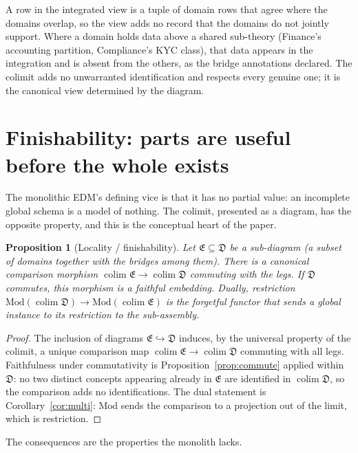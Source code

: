 \documentclass[11pt]{article}
\theoremstyle{plain}
\newtheorem{proposition}{Proposition}
\theoremstyle{definition}
\newcommand{\Mod}{\mathrm{Mod}}
\begin{document}
A row in the integrated view is a tuple of domain rows that agree where the domains overlap, so the view adds no record that the domains do not jointly support. Where a domain holds data above a shared sub-theory (Finance's accounting partition, Compliance's KYC class), that data appears in the integration and is absent from the others, as the bridge annotations declared. The colimit adds no unwarranted identification and respects every genuine one; it is the canonical view determined by the diagram.

\section{Finishability: parts are useful before the whole exists}\label{sec:finish}

The monolithic EDM's defining vice is that it has no partial value: an incomplete global schema is a model of nothing. The colimit, presented as a diagram, has the opposite property, and this is the conceptual heart of the paper.

\begin{proposition}[Locality / finishability]\label{prop:finish}
Let $\mathfrak{E}\subseteq\mathfrak{D}$ be a sub-diagram (a subset of domains together with the bridges among them). There is a canonical comparison morphism $\operatorname{colim}\mathfrak{E}\to\operatorname{colim}\mathfrak{D}$ commuting with the legs. If $\mathfrak{D}$ commutes, this morphism is a faithful embedding. Dually, restriction $\Mod(\operatorname{colim}\mathfrak{D})\to\Mod(\operatorname{colim}\mathfrak{E})$ is the forgetful functor that sends a global instance to its restriction to the sub-assembly.
\end{proposition}

\begin{proof}
The inclusion of diagrams $\mathfrak{E}\hookrightarrow\mathfrak{D}$ induces, by the universal property of the colimit, a unique comparison map $\operatorname{colim}\mathfrak{E}\to\operatorname{colim}\mathfrak{D}$ commuting with all legs. Faithfulness under commutativity is Proposition~\ref{prop:commute} applied within $\mathfrak{D}$: no two distinct concepts appearing already in $\mathfrak{E}$ are identified in $\operatorname{colim}\mathfrak{D}$, so the comparison adds no identifications. The dual statement is Corollary~\ref{cor:multi}: $\Mod$ sends the comparison to a projection out of the limit, which is restriction.
\end{proof}

The consequences are the properties the monolith lacks.
\end{document}
